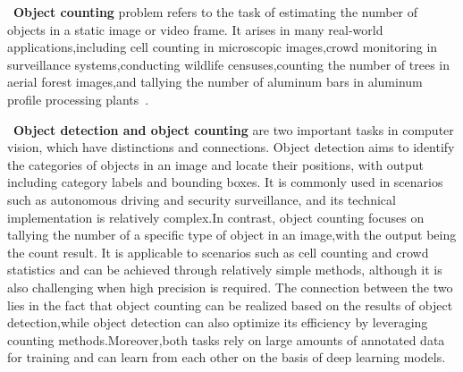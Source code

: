 \documentclass[lettersize,journal]{IEEEtran}
\begin{document}
~\textbf{Object counting} problem refers to the task of estimating the number of objects in a static image or video frame. It arises in many real-world applications,including cell counting in microscopic images,crowd monitoring in surveillance systems,conducting wildlife censuses,counting the number of trees in aerial forest images,and tallying the number of aluminum bars in aluminum profile processing plants~\cite{Lempitsky2010-ot}.

~\textbf{Object detection and object counting} are two important tasks in computer vision, which have distinctions and connections. Object detection aims to identify the categories of objects in an image and locate their positions, with output including category labels and bounding boxes. It is commonly used in scenarios such as autonomous driving and security surveillance, and its technical implementation is relatively complex.In contrast, object counting focuses on tallying the number of a specific type of object in an image,with the output being the count result. It is applicable to scenarios such as cell counting and crowd statistics and can be achieved through relatively simple methods, although it is also challenging when high precision is required. The connection between the two lies in the fact that object counting can be realized based on the results of object detection,while object detection can also optimize its efficiency by leveraging counting methods.Moreover,both tasks rely on large amounts of annotated data for training and can learn from each other on the basis of deep learning models.
\end{document}
